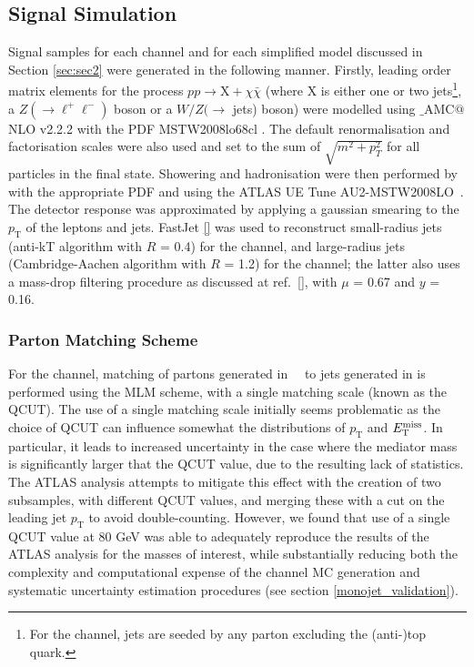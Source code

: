 \subsection{Signal Simulation}
\label{signal_generation}
Signal samples for each channel and for each simplified model discussed in Section \ref{sec:sec2} were generated in the following manner. Firstly, leading order matrix elements for the process $pp \rightarrow \mathrm{X} + \chi\bar{\chi}$ (where X is either one or two jets\footnote{For the \monojet channel, jets are seeded by any parton excluding the (anti-)top quark.}, a $Z(\rightarrow \ell^+ \ell^-)$ boson or a $W/Z(\rightarrow$ jets) boson) were modelled using \MG$\_${\footnotesize A}MC$@$NLO v2.2.2 \cite{MG_aMCNLO2014} with the PDF MSTW2008lo68cl \cite{MSTW}. The default renormalisation and factorisation scales were also used and set to the sum of $\sqrt{m^{2} + p_{T}^{2}}$ for all particles in the final state. Showering and hadronisation were then performed by  with the appropriate PDF and using the ATLAS UE Tune AU2-MSTW2008LO~\cite{AUtune}. The detector response was approximated by applying a gaussian smearing to the $p_{\mathrm{T}}$ of the leptons and jets. FastJet \ref{} was used to reconstruct small-radius jets (anti-kT algorithm with $R$ = 0.4) for the \monojet channel, and large-radius jets (Cambridge-Aachen algorithm with $R$ = 1.2) for the \monoWZ channel; the latter also uses a mass-drop filtering procedure as discussed at ref.~\ref{}, with $\mu$ = 0.67 and $y$ = 0.16.

\subsubsection{Parton Matching Scheme}
\label{matching_procedure}
For the \monojet channel, matching of partons generated in \MG$\mbox{ }$ to jets generated in \PYTHIA is performed using the MLM scheme, with a single matching scale (known as the QCUT). The use of a single matching scale initially seems problematic as the choice of QCUT can influence somewhat the distributions of $p_{\mathrm{T}}$ and $E_{\mathrm{T}}^{\mathrm{miss}}$. In particular, it leads to increased uncertainty in the case where the mediator mass is significantly larger that the QCUT value, due to the resulting lack of statistics. The ATLAS \monojet analysis attempts to mitigate this effect with the creation of two subsamples, with different QCUT values, and merging these with a cut on the leading jet $p_{\mathrm{T}}$ to avoid double-counting. However, we found that use of a single QCUT value at 80 GeV was able to adequately reproduce the results of the ATLAS \monojet analysis for the masses of interest, while substantially reducing both the complexity and computational expense of the \monojet channel MC generation and systematic uncertainty estimation procedures (see section \ref{monojet_validation}).

